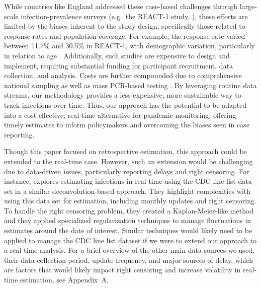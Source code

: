  While countries like England addressed these case-based challenges 
 through large-scale infection-prevalence surveys (e.g.\ the REACT-1 study, 
\citealp{react12022}),
 these efforts are limited by the biases inherent 
to the study design, specifically those related to response rates and population 
coverage.
For example, the response rate varied between 11.7\% and 30.5\% 
in REACT-1, with demographic variation, particularly in relation to age 
\citep{elliott2023design}. Additionally, 
such studies are expensive to design and implement, requiring 
substantial funding for participant recruitment, data collection, and analysis.
Costs are further compounded due to comprehensive national sampling 
  as well as mass PCR-based testing \citep{pavelka2021impact}.
By leveraging routine data streams, our methodology provides a less expensive, more 
sustainable way to track infections over time.
Thus, our approach has the potential to be adapted into a cost-effective, real-time 
alternative for pandemic monitoring, offering timely estimates to inform policymakers 
and 
overcoming the biases seen in case reporting. 

Though this paper focused on retrospective estimation, this approach could be
extended to the real-time case. However, such an extension would be 
challenging due to data-driven issues, particularly reporting delays and right censoring. For instance, 
\citet{jahja2022real} explores estimating infections in real-time using the CDC line list 
data set in a similar deconvolution-based approach. They highlight complexities with 
using this data set for estimation, including monthly updates and right censoring. To 
handle the right censoring problem, they created a Kaplan-Meier-like method and they 
applied specialized regularization techniques to manage fluctuations in estimates 
around the date of interest. Similar techniques would likely need to be applied to 
manage the CDC line list dataset if we were to extend our approach to a real-time 
analysis. For a brief overview of the other main data sources we used, their data 
collection period, update frequency, and major sources of delay, which are factors that 
would likely impact right censoring and increase volatility in real-time estimation, 
see Appendix~A. 

